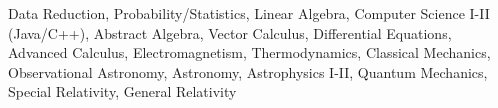 Data Reduction, Probability/Statistics, Linear Algebra, Computer
Science I-II (Java/C++), Abstract Algebra, Vector Calculus,
Differential Equations, Advanced Calculus, Electromagnetism,
Thermodynamics, Classical Mechanics, Observational Astronomy,
Astronomy, Astrophysics I-II,  Quantum Mechanics, Special
Relativity, General Relativity
